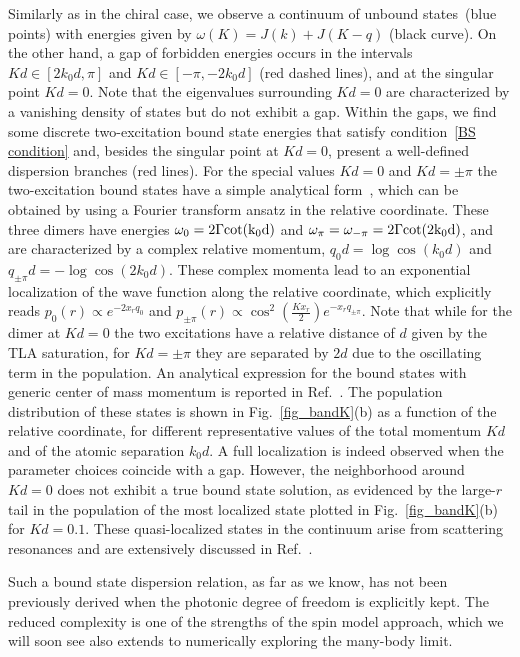 \documentclass[pra,twocolumn,showpacs,preprintnumbers,amsmath,amssymb]{revtex4-1}
\begin{document}
Similarly as in the chiral case, we observe a continuum of unbound states~(blue points) with energies given by $\omega(K)=J(k)+J(K-q)$ (black curve).
 On the other hand, a gap of forbidden energies occurs in the intervals $Kd\in[2k_0d,\pi]$ and $Kd\in[-\pi,-2k_0d]$ (red dashed lines), and at the singular point $Kd=0$. Note that the eigenvalues surrounding $Kd=0$ are characterized by a vanishing density of states but do not exhibit a gap. 
Within the gaps, we find some discrete two-excitation bound state energies that satisfy condition~\eqref{BS condition} and, besides the singular point at $Kd=0$, 
present a well-defined dispersion branches (red lines).
For the special values $Kd=0$ and $Kd=\pm\pi$ the two-excitation bound states have a simple analytical form~\cite{dimermolmer2},  which can be obtained  by using a Fourier transform ansatz in the relative coordinate.
These three dimers have energies $\omega_0=2\Gamma \rm cot(k_0d)$ and $\omega_{\pi}=\omega_{-\pi}=2\Gamma \rm cot(2k_0d)$, and
are characterized  by a complex relative  momentum, $q_0 d=\log{\cos{(k_0d)}}$ and $q_{\pm\pi}d=-\log{\cos{(2k_0d)}}$. These complex momenta  lead to an exponential localization of the wave function along the relative coordinate, which explicitly reads $p_0(r)\propto e^{-2x_r q_0}$ and $p_{\pm\pi}(r)\propto \cos^2( \frac{Kx_r}{2})e^{-x_r q_{\pm\pi}}$. Note that while for the dimer at $Kd=0$ the two excitations have a relative distance of $d$ given by the TLA saturation, for $Kd=\pm\pi$ they are separated by $2d$ due to the oscillating term in the population. An analytical expression for the bound states with generic center of mass momentum is reported in Ref.~\cite{Bakkensen}.
The population distribution of these states is shown in Fig.~\ref{fig_bandK}(b) as a function of the relative coordinate, for different representative values of the total momentum $Kd$ and of the atomic separation $k_0d$. A full localization is indeed observed when the parameter choices coincide with a gap. However, the neighborhood around $Kd=0$ does not exhibit a true bound state solution, as evidenced by the large-$r$ tail in the population of the most localized state plotted in Fig.~\ref{fig_bandK}(b) for $Kd=0.1$. These quasi-localized states in the continuum arise from scattering resonances and are extensively discussed in Ref.~\cite{Bakkensen}.


Such a bound state dispersion relation, as far as we know, has not been previously derived when the photonic degree of freedom is explicitly kept. The reduced complexity is one of the strengths of the spin model approach, which we will soon see also extends to numerically exploring the many-body limit.
\end{document}
